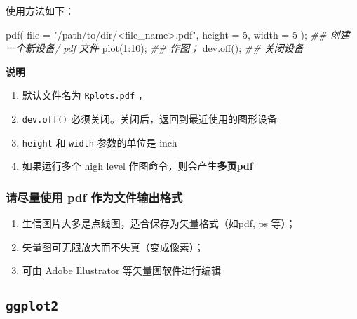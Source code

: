 \documentclass[
]{article}
\newenvironment{Shaded}{}{}
\newcommand{\AttributeTok}[1]{\textcolor[rgb]{0.49,0.56,0.16}{#1}}
\newcommand{\DecValTok}[1]{\textcolor[rgb]{0.25,0.63,0.44}{#1}}
\newcommand{\DocumentationTok}[1]{\textcolor[rgb]{0.73,0.13,0.13}{\textit{#1}}}
\newcommand{\FunctionTok}[1]{\textcolor[rgb]{0.02,0.16,0.49}{#1}}
\newcommand{\NormalTok}[1]{#1}
\newcommand{\SpecialCharTok}[1]{\textcolor[rgb]{0.25,0.44,0.63}{#1}}
\newcommand{\StringTok}[1]{\textcolor[rgb]{0.25,0.44,0.63}{#1}}
\begin{document}
使用方法如下：

\begin{Shaded}
\begin{Highlighting}[]
\FunctionTok{pdf}\NormalTok{( }\AttributeTok{file =} \StringTok{"/path/to/dir/\textless{}file\_name\textgreater{}.pdf"}\NormalTok{, }\AttributeTok{height =} \DecValTok{5}\NormalTok{, }\AttributeTok{width =} \DecValTok{5}\NormalTok{ ); }\DocumentationTok{\#\# 创建一个新设备/ pdf 文件 }
\FunctionTok{plot}\NormalTok{(}\DecValTok{1}\SpecialCharTok{:}\DecValTok{10}\NormalTok{); }\DocumentationTok{\#\# 作图；}
\FunctionTok{dev.off}\NormalTok{(); }\DocumentationTok{\#\# 关闭设备}
\end{Highlighting}
\end{Shaded}

\textbf{说明}

\begin{enumerate}
\def\labelenumi{\arabic{enumi}.}
\item
  默认文件名为 \texttt{Rplots.pdf} ，
\item
  \texttt{dev.off()} 必须关闭。关闭后，返回到最近使用的图形设备
\item
  \texttt{height} 和 \texttt{width} 参数的单位是 inch
\item
  如果运行多个 high level 作图命令，则会产生\textbf{多页pdf}
\end{enumerate}

\hypertarget{ux8bf7ux5c3dux91cfux4f7fux7528-pdf-ux4f5cux4e3aux6587ux4ef6ux8f93ux51faux683cux5f0f}{%
\subsubsection{请尽量使用 pdf
作为文件输出格式}\label{ux8bf7ux5c3dux91cfux4f7fux7528-pdf-ux4f5cux4e3aux6587ux4ef6ux8f93ux51faux683cux5f0f}}

\begin{enumerate}
\def\labelenumi{\arabic{enumi}.}
\item
  生信图片大多是点线图，适合保存为矢量格式（如pdf, ps 等）；
\item
  矢量图可无限放大而不失真（变成像素）；
\item
  可由 Adobe Illustrator 等矢量图软件进行编辑
\end{enumerate}

\hypertarget{ggplot2}{%
\subsection{\texorpdfstring{\texttt{ggplot2}}{ggplot2}}\label{ggplot2}}
\end{document}
